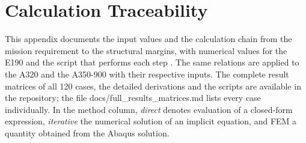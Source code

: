 
\chapter{Calculation Traceability}
\label{app:traceability}

This appendix documents the input values and the calculation chain from the mission requirement to the structural margins, with numerical values for the E190 and the script that performs each step \cite{ref32}. The same relations are applied to the A320 and the A350-900 with their respective inputs. The complete result matrices of all 120 cases, the detailed derivations and the scripts are available in the repository; the file docs/full\_results\_matrices.md lists every case individually. In the method column, \emph{direct} denotes evaluation of a closed-form expression, \emph{iterative} the numerical solution of an implicit equation, and FEM a quantity obtained from the Abaqus solution.

